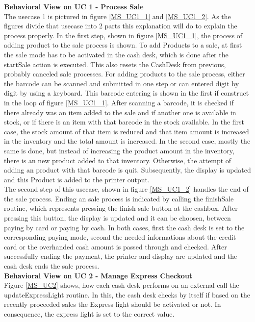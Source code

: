		\textbf{Behavioral View on UC 1 - Process Sale} \\
		The usecase 1 is pictured in figure \ref{MS_UC1_1} and \ref{MS_UC1_2}. As the figures divide that usecase into 2 parts this explanation will do to explain the process properly.
		In the first step, shown in figure \ref{MS_UC1_1}, the process of adding product to the sale process is shown. To add Products to a sale, at first the sale mode has to be activated in the cash desk, which is done after the startSale action is executed. This also resets the CashDesk from previous, probably canceled sale processes.
		For adding products to the sale process, either the barcode can be scanned and submitted in one step or can entered digit by digit by using a keyboard. This barcode entering is shown in the first if construct in the loop of figure \ref{MS_UC1_1}.
		After scanning a barcode, it is checked if there already was an item added to the sale and if another one is available in stock, or if there is an item with that barcode in the stock available. In the first case, the stock amount of that item is reduced and that item amount is increased in the inventory and the total amount is increased. In the second case, mostly the same is done, but instead of increasing the product amount in the inventory, there is an new product added to that inventory. Otherwise, the attempt of adding an product with that barcode is quit. Subsequently, the display is updated and this Product is added to the printer output.\\
		The second step of this usecase, shown in figure \ref{MS_UC1_2} handles the end of the sale process. Ending an sale process is indicated by calling the finishSale routine, which represents pressing the finish sale button at the cashbox. After pressing this button, the display is updated and it can be choosen, between paying by card or paying by cash. In both cases, first the cash desk is set to the corresponding paying mode, second the needed informations about the credit card or the overhanded cash amount is passed through and checked. 
		After successfully ending the payment, the printer and display are updated and the cash desk ends the sale process.\\
		 
		
		\textbf{Behavioral View on UC 2 - Manage Express Checkout} \\
		Figure \ref{MS_UC2} shows, how each cash desk performs on an external call the updateExpressLight routine. In this, the cash desk checks by itself if based on the recently proceeded sales the Express light should be activated or not. In consequence, the express light is set to the correct value. \\
		
